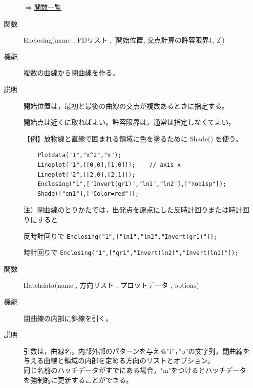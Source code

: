 \documentclass[papersize,a4paper,12pt,uplatex]{jsarticle}
\begin{document}
\begin{description}
\begin{flushright}  \hyperlink{functionlist}{$\Rightarrow$関数一覧}\end{flushright}

\vspace{\baselineskip}
\hypertarget{enclosing}{}
\item[関数]  Enclosing(name , PDリスト , [開始位置, 交点計算の許容限界1, 2])
\item[機能]  複数の曲線から閉曲線を作る。
\item[説明]  開始位置は，最初と最後の曲線の交点が複数あるときに指定する。

開始点は近くに取ればよい。許容限界は，通常は指定しなくてよい。

\vspace{\baselineskip}
【例】放物線と直線で囲まれる領域に色を塗るために Shade() を使う。
\begin{verbatim}
    Plotdata("1","x^2","x");
    Lineplot("1",[[0,0],[1,0]]);    // axis x
    Lineplot("2",[[2,0],[2,1]]);
    Enclosing("1",["Invert(gr1)","ln1","ln2"],["nodisp"]);
    Shade(["en1"],["Color=red"]);
\end{verbatim}
\vspace{\baselineskip}
 \begin{center}  \end{center}

\vspace{\baselineskip}
注）閉曲線のとりかたでは，出発点を原点にした反時計回りまたは時計回りにすると

    反時計回りで  \verb|Enclosing("1",["ln1","ln2","Invert(gr1)"]);|

    時計回りで    \verb|Enclosing("1",["gr1","Invert(ln2)","Invert(ln1)"]);|


\vspace{\baselineskip}
\hypertarget{hatchdata}{}
\item[関数]  Hatchdata(name , 方向リスト , プロットデータ , options)
\item[機能]  閉曲線の内部に斜線を引く。
\item[説明]  引数は，曲線名，内部外部のパターンを与える''i''，''o''の文字列，閉曲線を与える曲線と領域の内部を定める方向のリストとオプション。\\
  同じ名前のハッチデータがすでにある場合，"m"をつけるとハッチデータを強制的に更新することができる。
  

\end{description}
\end{document}
